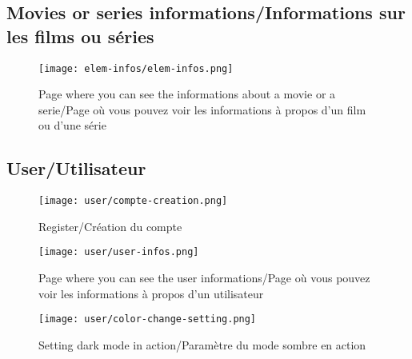 \pagebreak

\subsection{Movies or series informations/Informations sur les films ou séries}

\begin{figure}[H]
    \centering
    \texttt{[image: elem-infos/elem-infos.png]}
    \caption{Page where you can see the informations about a movie or a serie/Page où vous pouvez voir les informations à propos d'un film ou d'une série}
    \label{fig:elem-infos}
\end{figure}

\pagebreak

\subsection{User/Utilisateur}

\begin{figure}[H]
    \centering
    \texttt{[image: user/compte-creation.png]}
    \caption{Register/Création du compte}
    \label{fig:register}
\end{figure}

\begin{figure}[H]
    \centering
    \texttt{[image: user/user-infos.png]}
    \caption{Page where you can see the user informations/Page où vous pouvez voir les informations à propos d'un utilisateur}
    \label{fig:user-infos}
\end{figure}

\begin{figure}[H]
    \centering
    \texttt{[image: user/color-change-setting.png]}
    \caption{Setting dark mode in action/Paramètre du mode sombre en action}
    \label{fig:color-change-setting}
\end{figure}
